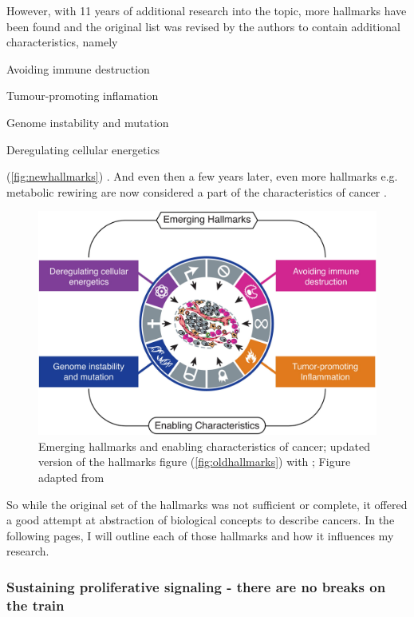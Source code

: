 However, with 11 years of additional research into the topic, more hallmarks have been found and the original list was revised by the authors to contain additional characteristics, namely 
\begin{enumerate*}
\item Avoiding immune destruction
\item Tumour-promoting inflamation
\item Genome instability and mutation
\item Deregulating cellular energetics
\end{enumerate*}
(\autoref{fig:newhallmarks}) \cite{Hanahan2011}. And even then a few years later, even more hallmarks e.g. metabolic rewiring are now considered a part of the characteristics of cancer \cite{Fouad2017}.

\begin{figure}[!ht]
\centering
\includegraphics[width=.95\linewidth]{Figures/newHallmarksCancer.jpg}
\caption[New hallmarks of cancer]{Emerging hallmarks and enabling characteristics of cancer; updated version of the hallmarks figure (\autoref{fig:oldhallmarks}) with ; Figure adapted from \protect\citeauthor*{Hanahan2011}\protect\cite{Hanahan2011}}\label{fig:newhallmarks}
\end{figure}

So while the original set of the hallmarks was not sufficient or complete, it offered a good attempt at abstraction of biological concepts to describe cancers. In the following pages, I will outline each of those hallmarks and how it influences my research.


\subsubsection{Sustaining proliferative signaling - there are no breaks on the train}

